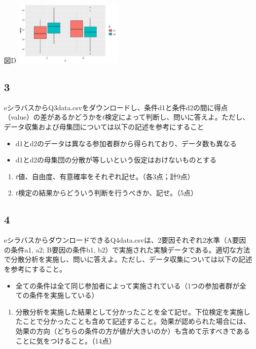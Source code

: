\documentclass[
]{article}
\providecommand{\tightlist}{%
  \setlength{\itemsep}{0pt}\setlength{\parskip}{0pt}}
\begin{document}
図D
\includegraphics[width=0.4\textwidth,height=\textheight]{./q2figD.png}

\subsection{3}\label{section-2}

eシラバスからQ3data.csvをダウンロードし、条件d1と条件d2の間に得点（value）の差があるかどうかを\(t\)検定によって判断し、問いに答えよ。ただし、データ収集および母集団については以下の記述を参考にすること

\begin{itemize}
\tightlist
\item
  d1とd2のデータは異なる参加者群から得られており、データ数も異なる
\item
  d1とd2の母集団の分散が等しいという仮定はおけないものとする
\end{itemize}

\begin{enumerate}
\def\labelenumi{\arabic{enumi}.}
\tightlist
\item
  \(t\)値、自由度、有意確率をそれぞれ記せ。（各3点；計9点）
\item
  \(t\)検定の結果からどういう判断を行うべきか、記せ。（5点）
\end{enumerate}

\subsection{4}\label{section-3}

eシラバスからダウンロードできるQ4data.csvは、2要因それぞれ2水準（A要因の条件a1,
a2; B要因の条件b1,
b2）で実施された実験データである。適切な方法で分散分析を実施し、問いに答えよ。ただし、データ収集については以下の記述を参考にすること。

\begin{itemize}
\tightlist
\item
  全ての条件は全て同じ参加者によって実施されている（1つの参加者群が全ての条件を実施している）
\end{itemize}

\begin{enumerate}
\def\labelenumi{\arabic{enumi}.}
\tightlist
\item
  分散分析を実施した結果として分かったことを全て記せ。下位検定を実施したことで分かったことも含めて記述すること。効果が認められた場合には、効果の方向（どちらの条件の方が値が大きいのか）も含めて示すべきであることに気をつけること。（14点）
\end{enumerate}
\end{document}
